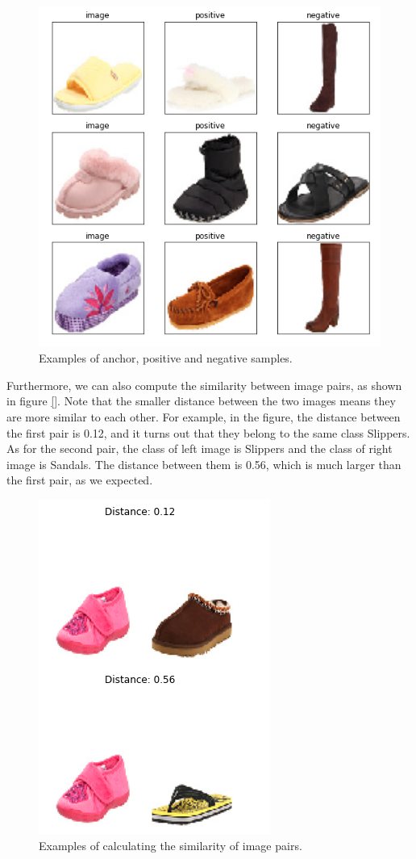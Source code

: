\begin{figure}[h]
  \centering
  \includegraphics[width=0.9\linewidth]{figs/threesamples.png}
  \caption{Examples of anchor, positive and negative samples.}
  \label{fig:threesamples}
\end{figure}

Furthermore, we can also compute the similarity between image pairs, as shown in figure \ref{}. Note that the smaller distance between the two images means they are more similar to each other. For example, in the figure, the distance between the first pair is 0.12, and it turns out that they belong to the same class Slippers. As for the second pair, the class of left image is Slippers and the class of right image is Sandals. The distance between them is 0.56, which is much larger than the first pair, as we expected. 

\begin{figure}[h]
  \centering
  \includegraphics[width=0.5\linewidth]{figs/similarity.png}
  \caption{Examples of calculating the similarity of image pairs.}
  \label{fig:similarity}
\end{figure}

